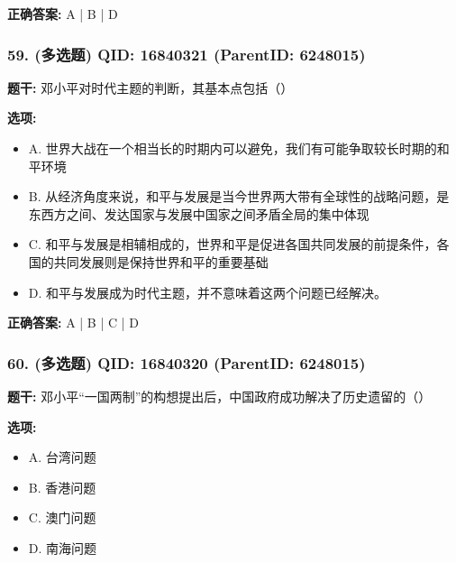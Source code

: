 \documentclass[12pt,UTF8]{ctexart}
\begin{document}
\textbf{正确答案:}
A | B | D

\vspace{0.3em}\hrulefill\vspace{0.7em}

\subsubsection*{59. (多选题) \small QID: 16840321 (ParentID: 6248015)}

\textbf{题干:}
邓小平对时代主题的判断，其基本点包括（）



\textbf{选项:}
\begin{itemize}[leftmargin=*]

  \item A. 世界大战在一个相当长的时期内可以避免，我们有可能争取较长时期的和平环境

  \item B. 从经济角度来说，和平与发展是当今世界两大带有全球性的战略问题，是东西方之间、发达国家与发展中国家之间矛盾全局的集中体现

  \item C. 和平与发展是相辅相成的，世界和平是促进各国共同发展的前提条件，各国的共同发展则是保持世界和平的重要基础

  \item D. 和平与发展成为时代主题，并不意味着这两个问题已经解决。

\end{itemize}

\textbf{正确答案:}
A | B | C | D

\vspace{0.3em}\hrulefill\vspace{0.7em}

\subsubsection*{60. (多选题) \small QID: 16840320 (ParentID: 6248015)}

\textbf{题干:}
邓小平“一国两制”的构想提出后，中国政府成功解决了历史遗留的（）



\textbf{选项:}
\begin{itemize}[leftmargin=*]

  \item A. 台湾问题

  \item B. 香港问题

  \item C. 澳门问题

  \item D. 南海问题

\end{itemize}
\end{document}
